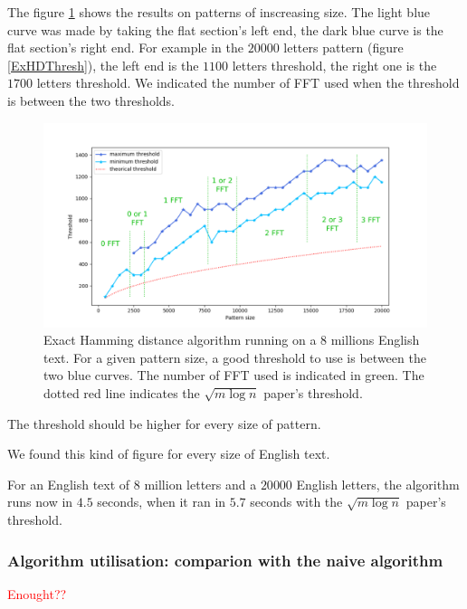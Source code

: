 \documentclass[preprint,12pt]{elsarticle}
\begin{document}
The figure \ref{ExHDThreshAll} shows the results on patterns of inscreasing size.
The light blue curve was made by taking the flat section's left end, 
the dark blue curve is the flat section's right end.
For example in the $20 000$ letters pattern (figure \ref{ExHDThresh}),
the left end is the $1100$ letters threshold,
the right one is the $1700$ letters threshold.
We indicated the number of FFT used when the threshold is between the two thresholds.



\begin{figure}[h]
\includegraphics[scale=0.56]{./figures/ExHDThresholdAll.png}
\caption{Exact Hamming distance algorithm
running on a $8$ millions English text.
For a given pattern size,
a good threshold to use is between the two blue curves.
The number of FFT used is indicated in green.
The dotted red line indicates the $\sqrt{m \log n}$ paper's threshold.}
\label{ExHDThreshAll}
\end{figure}


The threshold should be higher for every size of pattern.

We found this kind of figure for every size of English text.

For an English text of $8$ million letters and a $20 000$ English letters,
the algorithm runs now in $4.5$ seconds, 
when it ran in $5.7$ seconds with the $\sqrt{m \log n}$ paper's threshold.

\subsubsection*{Algorithm utilisation: comparion with the naive algorithm}

\textcolor{red}{Enought??}
\end{document}
